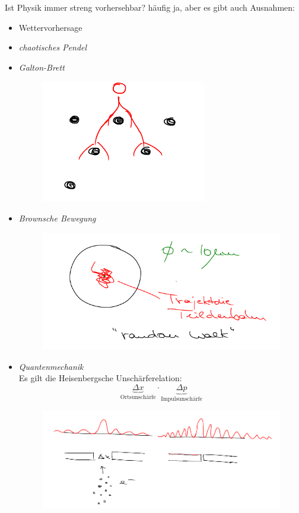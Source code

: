 \documentclass[a4paper,10pt]{scrartcl}
\begin{document}
\begin{seg}{Ist Physik immer streng vorhersehbar?}
häufig ja, aber es gibt auch Ausnahmen:
\begin{itemize}
\item Wettervorhersage
\item \emph{chaotisches Pendel}
\item \emph{Galton-Brett}
\begin{figure}[h]
\includegraphics{fig1.png}
\end{figure}
\item \emph{Brownsche Bewegung}

\begin{figure}[h]
\includegraphics[scale=0.5]{fig2.png}
\end{figure}

\item \emph{Quantenmechanik}\\
Es gilt die Heisenbergsche Unschärferelation:
\[
\underbrace{\Delta x}_{\text{Ortsunschärfe}} \cdot \underbrace{\Delta p}_{\text{Impulsunschärfe}}
\]
\begin{figure}[h]
\includegraphics[scale=0.5]{fig3.png}
\end{figure}
\end{itemize}

\end{seg}
\end{document}
